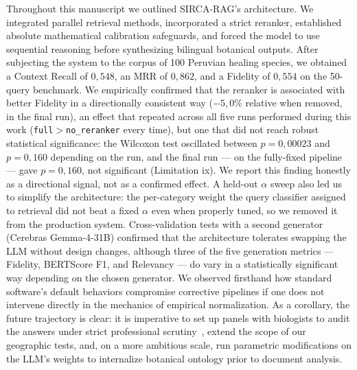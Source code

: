 \documentclass[runningheads]{llncs}
\newcommand{\sirca}{\textsc{SIRCA-RAG}}
\begin{document}
Throughout this manuscript we outlined \sirca{}'s architecture. We integrated parallel retrieval methods, incorporated a strict reranker, established absolute mathematical calibration safeguards, and forced the model to use sequential reasoning before synthesizing bilingual botanical outputs. After subjecting the system to the corpus of 100 Peruvian healing species, we obtained a Context Recall of $0{,}548$, an MRR of $0{,}862$, and a Fidelity of $0{,}554$ on the 50-query benchmark. We empirically confirmed that the reranker is associated with better Fidelity in a directionally consistent way ($-5{,}0\%$ relative when removed, in the final run), an effect that repeated across all five runs performed during this work (\texttt{full}${>}$\texttt{no\_reranker} every time), but one that did not reach robust statistical significance: the Wilcoxon test oscillated between $p{=}0{,}00023$ and $p{=}0{,}160$ depending on the run, and the final run — on the fully-fixed pipeline — gave $p{=}0{,}160$, not significant (Limitation ix). We report this finding honestly as a directional signal, not as a confirmed effect. A held-out $\alpha$ sweep also led us to simplify the architecture: the per-category weight the query classifier assigned to retrieval did not beat a fixed $\alpha$ even when properly tuned, so we removed it from the production system. Cross-validation tests with a second generator (Cerebras Gemma-4-31B) confirmed that the architecture tolerates swapping the LLM without design changes, although three of the five generation metrics — Fidelity, BERTScore F1, and Relevancy — do vary in a statistically significant way depending on the chosen generator. We observed firsthand how standard software's default behaviors compromise corrective pipelines if one does not intervene directly in the mechanics of empirical normalization. As a corollary, the future trajectory is clear: it is imperative to set up panels with biologists to audit the answers under strict professional scrutiny~\cite{heinrich2020ethnopharmacology}, extend the scope of our geographic tests, and, on a more ambitious scale, run parametric modifications on the LLM's weights to internalize botanical ontology prior to document analysis.




\end{document}
